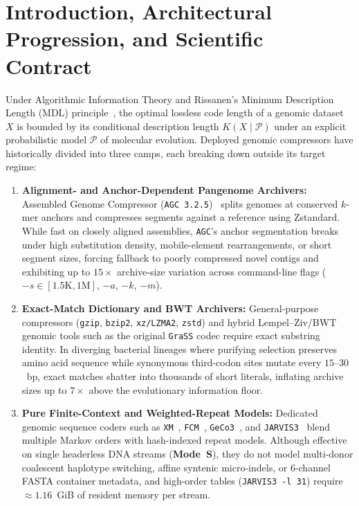 \documentclass[10pt]{article}
\theoremstyle{definition}
\begin{document}
\section{Introduction, Architectural Progression, and Scientific Contract}

Under Algorithmic Information Theory and Rissanen's Minimum Description Length (MDL) principle~\cite{rissanen1978modeling}, the optimal lossless code length of a genomic dataset $X$ is bounded by its conditional description length $K(X \mid \mathcal{P})$ under an explicit probabilistic model $\mathcal{P}$ of molecular evolution. Deployed genomic compressors have historically divided into three camps, each breaking down outside its target regime:
\begin{enumerate}
  \item \textbf{Alignment- and Anchor-Dependent Pangenome Archivers:} Assembled Genome Compressor (\texttt{AGC~3.2.5})~\cite{deorowicz2023agc} splits genomes at conserved $k$-mer anchors and compresses segments against a reference using Zstandard. While fast on closely aligned assemblies, \texttt{AGC}'s anchor segmentation breaks under high substitution density, mobile-element rearrangements, or short segment sizes, forcing fallback to poorly compressed novel contigs and exhibiting up to $15\times$ archive-size variation across command-line flags ($-s \in [1.5\text{K}, 1\text{M}]$, $-a$, $-k$, $-m$).
  \item \textbf{Exact-Match Dictionary and BWT Archivers:} General-purpose compressors (\texttt{gzip}, \texttt{bzip2}, \texttt{xz/LZMA2}, \texttt{zstd}) and hybrid Lempel--Ziv/BWT genomic tools such as the original \texttt{GraSS} codec require exact substring identity. In diverging bacterial lineages where purifying selection preserves amino acid sequence while synonymous third-codon sites mutate every $15\text{--}30$~bp, exact matches shatter into thousands of short literals, inflating archive sizes up to $7\times$ above the evolutionary information floor.
  \item \textbf{Pure Finite-Context and Weighted-Repeat Models:} Dedicated genomic sequence coders such as \texttt{XM}~\cite{cao2007simple}, \texttt{FCM}~\cite{pinho2011fcm}, \texttt{GeCo3}~\cite{silva2020geco3}, and \texttt{JARVIS3}~\cite{sousa2024jarvis3} blend multiple Markov orders with hash-indexed repeat models. Although effective on single headerless DNA streams (\textbf{Mode~S}), they do not model multi-donor coalescent haplotype switching, affine syntenic micro-indels, or 6-channel FASTA container metadata, and high-order tables (\texttt{JARVIS3 -l 31}) require $\approx 1.16$~GiB of resident memory per stream.
\end{enumerate}
\end{document}
